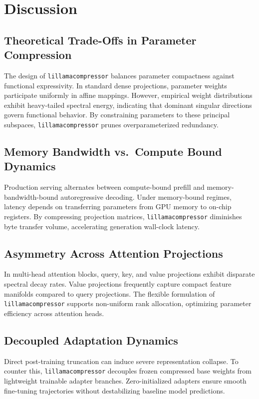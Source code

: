 \section{Discussion}

\subsection{Theoretical Trade-Offs in Parameter Compression}
The design of \texttt{lillamacompressor} balances parameter compactness against functional expressivity. In standard dense projections, parameter weights participate uniformly in affine mappings. However, empirical weight distributions exhibit heavy-tailed spectral energy, indicating that dominant singular directions govern functional behavior. By constraining parameters to these principal subspaces, \texttt{lillamacompressor} prunes overparameterized redundancy.

\subsection{Memory Bandwidth vs.\ Compute Bound Dynamics}
Production serving alternates between compute-bound prefill and memory-bandwidth-bound autoregressive decoding. Under memory-bound regimes, latency depends on transferring parameters from GPU memory to on-chip registers. By compressing projection matrices, \texttt{lillamacompressor} diminishes byte transfer volume, accelerating generation wall-clock latency.

\subsection{Asymmetry Across Attention Projections}
In multi-head attention blocks, query, key, and value projections exhibit disparate spectral decay rates. Value projections frequently capture compact feature manifolds compared to query projections. The flexible formulation of \texttt{lillamacompressor} supports non-uniform rank allocation, optimizing parameter efficiency across attention heads.

\subsection{Decoupled Adaptation Dynamics}
Direct post-training truncation can induce severe representation collapse. To counter this, \texttt{lillamacompressor} decouples frozen compressed base weights from lightweight trainable adapter branches. Zero-initialized adapters ensure smooth fine-tuning trajectories without destabilizing baseline model predictions.

